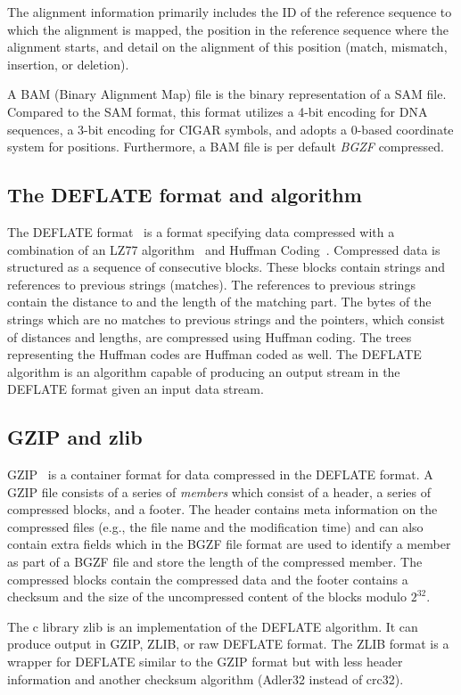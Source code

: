 The alignment information primarily includes the ID of the reference sequence to which the alignment is mapped, the position in the reference sequence where the alignment starts, and detail on the alignment of this position (match, mismatch, insertion, or deletion). 

A BAM (Binary Alignment Map) file is the binary representation of a SAM file. Compared to the SAM format, this format utilizes a 4-bit encoding for DNA sequences, a 3-bit encoding for CIGAR symbols, and adopts a 0-based coordinate system for positions. Furthermore, a BAM file is per default \textit{BGZF} compressed.

\subsection{The DEFLATE format and algorithm}
The DEFLATE format~\cite{deflate} is a format specifying data compressed with a combination of an LZ77 algorithm~\cite{ziv_universal_1977} and Huffman Coding~\cite{huffman_method_1952}. Compressed data is structured as a sequence of consecutive blocks. These blocks contain strings and references to previous strings (matches). The references to previous strings contain the distance to and the length of the matching part. The bytes of the strings which are no matches to previous strings and the pointers, which consist of distances and lengths, are compressed using Huffman coding. The trees representing the Huffman codes are Huffman coded as well. 
The DEFLATE algorithm is an algorithm capable of producing an output stream in the DEFLATE format given an input data stream.

\subsection{GZIP and zlib}
GZIP~\cite{gzip} is a container format for data compressed in the DEFLATE format. A GZIP file consists of a series of \textit{members} which consist of a header, a series of compressed blocks, and a footer. The header contains meta information on the compressed files (e.g., the file name and the modification time) and can also contain extra fields which in the BGZF file format are used to identify a member as part of a BGZF file and store the length of the compressed member. The compressed blocks contain the compressed data and the footer contains a checksum and the size of the uncompressed content of the blocks modulo $2^{32}$. 

The c library zlib is an implementation of the DEFLATE algorithm. It can produce output in GZIP, ZLIB, or raw DEFLATE format. The ZLIB format is a wrapper for DEFLATE similar to the GZIP format but with less header information and another checksum algorithm (Adler32 instead of crc32).


